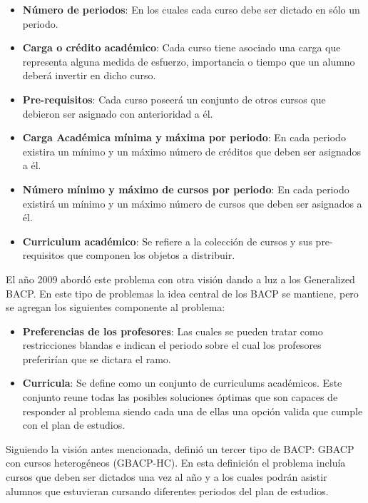\documentclass[letter, 10pt]{article}
\begin{document}
\begin{itemize}
\item \textbf{Número de periodos}: En los cuales cada curso debe ser dictado en sólo un periodo.
\item \textbf{Carga o crédito académico}: Cada curso tiene asociado una carga
  que representa alguna medida de esfuerzo, importancia o tiempo que un alumno
  deberá invertir en dicho curso.
\item \textbf{Pre-requisitos}: Cada curso poseerá un conjunto de otros cursos
  que debieron ser asignado con anterioridad a él.
\item \textbf{Carga Académica mínima y máxima por periodo}: En cada periodo
  existira un mínimo y un máximo número de créditos que deben ser asignados a
  él.
\item \textbf{Número mínimo y máximo de cursos por periodo}: En cada periodo
  existirá un mínimo y un máximo número de cursos que deben ser asignados a él.
\item \textbf{Curriculum académico}: Se refiere a la colección de cursos y sus
  pre-requisitos que componen los objetos a distribuir.
\end{itemize}


El año 2009 \cite{chiarandini2012balanced} abordó este problema con otra
visión dando a luz a los Generalized BACP. En este tipo de problemas la
idea central de los BACP se mantiene, pero se agregan los siguientes
componente al problema:

\begin{itemize}
\item \textbf{Preferencias de los profesores}: Las cuales se pueden
  tratar como restricciones blandas e indican el periodo sobre el cual
  los profesores preferirían que se dictara el ramo.
\item \textbf{Curricula}: Se define como un conjunto de curriculums
  académicos. Este conjunto reune todas las posibles soluciones óptimas
  que son capaces de responder al problema siendo cada una de ellas una
  opción valida que cumple con el plan de estudios.
\end{itemize}

Siguiendo la visión antes mencionada, \cite{schaerfmodelling} definió un
tercer tipo de BACP: GBACP con cursos heterogéneos (GBACP-HC). En esta
definición el problema incluía cursos que deben ser dictados una vez al
año y a los cuales podrán asistir alumnos que estuvieran cursando
diferentes periodos del plan de estudios.
\end{document}

